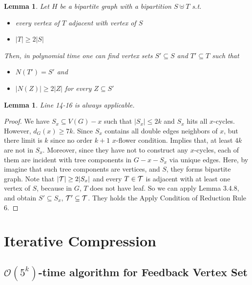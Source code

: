 \documentclass[12pt, a4paper, openany, twoside]{book}
\newtheorem{lem}[thm]{Lemma}
\theoremstyle{definition}
\theoremstyle{remark}
\newcommand{\CO}{{\mathcal {O}}} \newcommand{\CP}{{\mathcal {P}}}
\theoremstyle{plain}
\numberwithin{equation}{section}
\begin{document}
\begin{lem}
    
Let $H$ be a bipartite graph with a bipartition $S \uplus T$ s.t. 
\begin{itemize}
    \item every vertex of $T$ adjacent with vertex of $S$
    \item $|T| \geq 2|S|$
\end{itemize}
Then, in polynomial time one can find vertex sets $S' \subseteq S$ and $T' \subseteq T$ such that 
\begin{itemize}
    \item $N(T') = S'$ and 
    \item $|N(Z)| \geq 2|Z|$ for every $Z \subseteq S'$
\end{itemize}

\end{lem}

\begin{lem}
    Line 14-16 is always applicable.
\end{lem}

\begin{proof}
    
We have $S_x \subseteq V(G) - x$ such that $|S_x| \leq 2k$ and $S_x$ hits all $x$-cycles. 
However, $d_G(x) \geq 7k$. Since $S_x$ contains all double edges neighbors of $x$, but there limit is $k$ since no order $k+1$ $x$-flower condition. Implies that, at least $4k$ are not in $S_x$. Moreover, since they have not to construct any $x$-cycles, 
each of them are incident with tree components in $G - x - S_x$ via unique edges. Here, by imagine that such tree components are vertices, 
and $S$, they forms bipartite graph. Note that $|{\mathcal {T}}| \geq 2|S_x|$ and every $T \in {\mathcal {T}}$ is adjacent with at least one vertex of $S$, because 
in $G$, $T$ does not have leaf. So we can apply Lemma 3.4.8, and obtain $S' \subseteq S_x$, ${\mathcal {T}}' \subseteq {\mathcal {T}}$. 
They holds the Apply Condition of Reduction Rule 6.

\end{proof}

\chapter{Iterative Compression}

\section{$\CO(5^k)$-time algorithm for Feedback Vertex Set}
\end{document}
